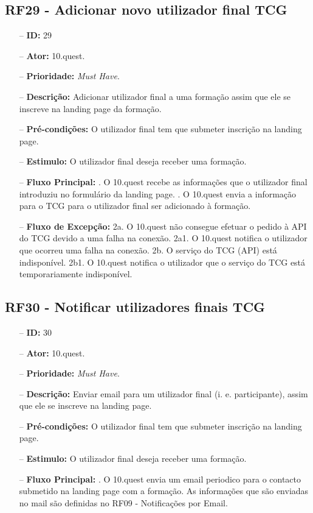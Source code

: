 \subsection{RF29 - Adicionar novo utilizador final TCG}
\begin{itemize}
	\item[--] \textbf{ID:} 29
	\item[--]  \textbf{Ator:} 10.quest.
	\item[--]  \textbf{Prioridade:} \textit{Must Have}.
	\item[--]  \textbf{Descrição:} Adicionar utilizador final a uma formação assim que ele se inscreve na landing page da formação.
	\item[--]  \textbf{Pré-condições:} O utilizador final tem que submeter inscrição na landing page.
	\item[--]  \textbf{Estimulo:} O utilizador final deseja receber uma formação.
	\item[--]  \textbf{Fluxo Principal:} 
	. O 10.quest recebe as informações que o utilizador final introduziu no formulário da landing page.
	. O 10.quest envia a informação para o TCG para o utilizador final ser adicionado à formação.
	\item[--]  \textbf{Fluxo de Excepção:} 
	\subitem 2a. O 10.quest não consegue efetuar o pedido à API do TCG devido a uma falha na conexão.
	\subitem 2a1. O 10.quest notifica o utilizador que ocorreu uma falha na conexão.
	\subitem 2b. O serviço do TCG (API) está indisponível.
	\subitem 2b1. O 10.quest notifica o utilizador que o serviço do TCG está temporariamente indisponível. 
\end{itemize}
\newpage

\subsection{RF30 - Notificar utilizadores finais TCG}
\begin{itemize}
	\item[--] \textbf{ID:} 30
	\item[--]  \textbf{Ator:} 10.quest.
	\item[--]  \textbf{Prioridade:} \textit{Must Have}.
	\item[--]  \textbf{Descrição:} Enviar email para um utilizador final (i. e. participante), assim que ele se inscreve na landing page.
	\item[--]  \textbf{Pré-condições:} O utilizador final tem que submeter inscrição na landing page.
	\item[--]  \textbf{Estimulo:} O utilizador final deseja receber uma formação.
	\item[--]  \textbf{Fluxo Principal:} 
	. O 10.quest envia um email periodico para o contacto submetido na landing page com a formação. As informações que são enviadas no mail são definidas no RF09 - Notificações por Email.
\end{itemize}
\newpage

